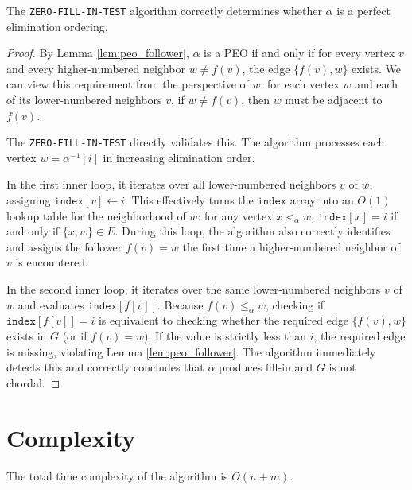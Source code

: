 \begin{theorem}
The \texttt{ZERO-FILL-IN-TEST} algorithm correctly determines whether $\alpha$ is a perfect elimination ordering.
\end{theorem}
\begin{proof}
By Lemma \ref{lem:peo_follower}, $\alpha$ is a PEO if and only if for every vertex $v$ and every higher-numbered neighbor $w \neq f(v)$, the edge $\{f(v), w\}$ exists. We can view this requirement from the perspective of $w$: for each vertex $w$ and each of its lower-numbered neighbors $v$, if $w \neq f(v)$, then $w$ must be adjacent to $f(v)$.

The \texttt{ZERO-FILL-IN-TEST} directly validates this. The algorithm processes each vertex $w = \alpha^{-1}[i]$ in increasing elimination order. 

In the first inner loop, it iterates over all lower-numbered neighbors $v$ of $w$, assigning $\texttt{index}[v] \gets i$. This effectively turns the $\texttt{index}$ array into an $O(1)$ lookup table for the neighborhood of $w$: for any vertex $x <_\alpha w$, $\texttt{index}[x] = i$ if and only if $\{x, w\} \in E$. During this loop, the algorithm also correctly identifies and assigns the follower $f(v) = w$ the first time a higher-numbered neighbor of $v$ is encountered.

In the second inner loop, it iterates over the same lower-numbered neighbors $v$ of $w$ and evaluates $\texttt{index}[f[v]]$. Because $f(v) \le_\alpha w$, checking if $\texttt{index}[f[v]] = i$ is equivalent to checking whether the required edge $\{f(v), w\}$ exists in $G$ (or if $f(v) = w$). If the value is strictly less than $i$, the required edge is missing, violating Lemma \ref{lem:peo_follower}. The algorithm immediately detects this and correctly concludes that $\alpha$ produces fill-in and $G$ is not chordal.
\end{proof}

\section{Complexity}

\begin{theorem}
The total time complexity of the algorithm is $O(n + m)$.
\end{theorem}

